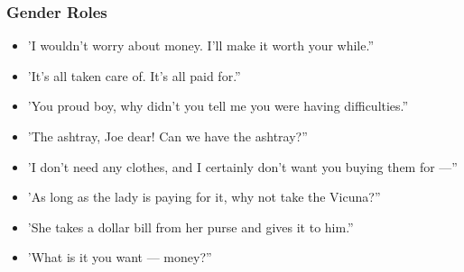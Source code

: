 \documentclass[a4paper]{article}
\begin{document}
\subsubsection{Gender Roles}
\begin{itemize}
\item 'I wouldn't worry about money. I'll make it worth your while.”
\item 'It's all taken care of. It's all paid for.”
\item 'You proud boy, why didn't you tell me you were having difficulties.”
\item 'The ashtray, Joe dear! Can we have the ashtray?”
\item 'I don't need any clothes, and I certainly don't want you buying them for —”
\item 'As long as the lady is paying for it, why not take the Vicuna?”
\item 'She takes a dollar bill from her purse and gives it to him.”
\item 'What is it you want — money?”
\end{itemize}
\end{document}
